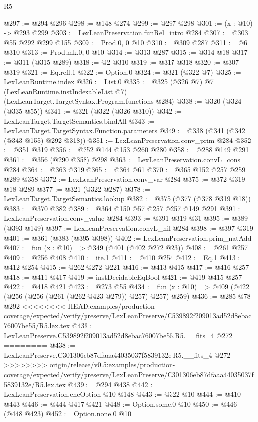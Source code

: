 \begin{lexlean}{R5}
\begin{coremodule}
{{{{{{{{{@297 := @294 @296
@298 := @148 @274
@299 := @297 @298
@301 := (x : @10) -> @293 @299
@303 := LexLeanPreservation.funRel_intro @284
@307 := @303 @55 @292 @299 @155
@309 := Prod.{0, 0} @10
@310 := @309 @287
@311 := @6 @310
@313 := Prod.mk.{0, 0} @10
@314 := @313 @287
@315 := @314 @18
@317 := @311 (@315 @289)
@318 := @2 @310
@319 := @317 @318
@320 := @307 @319
@321 := Eq.refl.{1}
@322 := Option.{0}
@324 := @321 (@322 @7)
@325 := LexLeanRuntime.index
@326 := List.{0}
@335 := @325
    (@326 @7)
    @7
    (LexLeanRuntime.instIndexableList @7)
    (LexLeanTarget.TargetSyntax.Program.functions @284)
@338 := @320 (@324 (@335 @55))
@341 := @321 (@322 (@326 @310))
@342 := LexLeanTarget.TargetSemantics.bindAll
@343 := LexLeanTarget.TargetSyntax.Function.parameters
@349 := @338 (@341 (@342 (@343 @155) @292 @318))
@351 := LexLeanPreservation.conv_prim @284
@352 := @351 @319
@356 := @352 @144 @153 @260 @280
@358 := @288 @149 @291
@361 := @356 (@290 @358) @298
@363 := LexLeanPreservation.convL_cons @284
@364 := @363 @319
@365 := @364 @61
@370 := @365 @152 @257 @259 @289 @358
@372 := LexLeanPreservation.conv_var @284
@375 := @372 @319 @18 @289
@377 := @321 (@322 @287)
@378 := LexLeanTarget.TargetSemantics.lookup
@382 := @375 (@377 (@378 @319 @18))
@383 := @370 @382
@389 := @364 @150 @57 @257 @257 @149 @291
@391 := LexLeanPreservation.conv_value @284
@393 := @391 @319 @31
@395 := @389 (@393 @149)
@397 := LexLeanPreservation.convL_nil @284
@398 := @397 @319
@401 := @361 (@383 (@395 @398))
@402 := LexLeanPreservation.prim_natAdd
@407 := fun (x : @10) => @349 (@401 (@402 @272 @23))
@408 := @261 @257
@409 := @256 @408
@410 := ite.{1}
@411 := @410 @254
@412 := Eq.{1}
@413 := @412 @254
@415 := @262 @272 @221
@416 := @413 @415
@417 := @416 @257
@418 := @411 @417
@419 := instDecidableEqBool
@421 := @419 @415 @257
@422 := @418 @421
@423 := @273 @55
@434 := fun (x : @10) => @409 (@422 (@256 (@256 (@261 (@262 @423 @279)) @257) @257) @259)
@436 := @285 @78 @292
<<<<<<<< HEAD:examples/production-coverage/expected/verify/preserve/LexLeanPreserve/C539892f209013ad52d8ebac76007be55/R5.lex.tex
@438 := LexLeanPreserve.C539892f209013ad52d8ebac76007be55.R5.__fits_4 @272
========
@438 := LexLeanPreserve.C301306eb87dfaaa44035037f5839132e.R5.__fits_4 @272
>>>>>>>> origin/release/v0.5:examples/production-coverage/expected/verify/preserve/LexLeanPreserve/C301306eb87dfaaa44035037f5839132e/R5.lex.tex
@439 := @294 @438
@442 := LexLeanPreservation.encOption @10 @148
@443 := @322 @10
@444 := @410 @443
@446 := @444 @417 @421
@448 := Option.some.{0} @10
@450 := @446 (@448 @423)
@452 := Option.none.{0} @10
}}}}}}}}}
\end{coremodule}
\end{lexlean}
